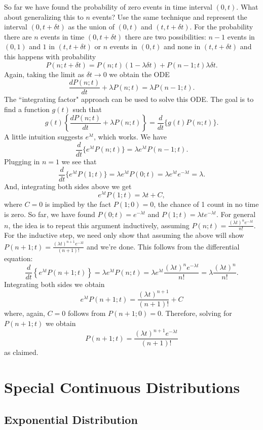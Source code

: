 \documentclass[]{book}
\begin{document}
So far we have found the probability of zero events in time interval
\((0,t)\). What about generalizing this to \(n\) events? Use the same
technique and represent the interval \((0, t+\delta t)\) as the union of
\((0,t)\) and \((t, t+\delta t)\). For the probability there are \(n\)
events in time \((0,t+\delta t)\) there are two possibilities: \(n-1\)
events in \((0,1)\) and \(1\) in \((t, t+\delta t)\) or \(n\) events in
\((0,t)\) and none in \((t, t+\delta t)\) and this happens with
probability
\[P(n;t+\delta t)  = P(n;t)(1-\lambda \delta t) + P(n-1;t)\lambda\delta t.\]
Again, taking the limit as \(\delta t \rightarrow 0\) we obtain the ODE
\[\frac{d P(n;t)}{dt} + \lambda P(n;t) = \lambda P(n-1;t).\] The
``integrating factor" approach can be used to solve this ODE. The goal
is to find a function \(g(t)\) such that
\[g(t)\left\{\frac{d P(n;t)}{dt} + \lambda P(n;t)\right\} = \frac{d}{dt}\{g(t)P(n;t)\}.\]
A little intuition suggests \(e^{\lambda t}\), which works. We have
\[\frac{d}{dt}\{e^{\lambda t}P(n;t)\} = \lambda e^{\lambda t}P(n-1;t).\]
Plugging in \(n=1\) we see that
\[\frac{d}{dt}\{e^{\lambda t}P(1;t)\} = \lambda e^{\lambda t}P(0;t) = \lambda e^{\lambda t}e^{-\lambda t} = \lambda.\]
And, integrating both sides above we get
\[e^{\lambda t}P(1;t) = \lambda t + C,\] where \(C = 0\) is implied by
the fact \(P(1;0) = 0\), the chance of 1 count in no time is zero. So
far, we have found \(P(0;t) = e^{-\lambda t}\) and
\(P(1;t) = \lambda t e^{-\lambda t}\). For general \(n\), the idea is to
repeat this argument inductively, assuming
\(P(n;t) = \frac{(\lambda t)^n e^{-\lambda t}}{n!}\). For the inductive
step, we need only show that assuming the above will show
\(P(n+1;t) = \frac{(\lambda t)^{n+1} e^{-\lambda t}}{(n+1)!}\) and we're
done. This follows from the differential equation:
\[\frac{d}{dt}\left\{e^{\lambda t}P(n+1;t)\right\} = \lambda e^{\lambda t}P(n;t) = \lambda e^{\lambda t} \frac{(\lambda t)^n e^{-\lambda t}}{n!} = \lambda \frac{(\lambda t)^n}{n!}.\]
Integrating both sides we obtain
\[e^{\lambda t}P(n+1;t) = \frac{(\lambda t)^{n+1}}{(n+1)!}+C\] where,
again, \(C=0\) follows from \(P(n+1;0) = 0\). Therefore, solving for
\(P(n+1;t)\) we obtain
\[P(n+1;t) = \frac{(\lambda t)^{n+1}e^{-\lambda t}}{(n+1)!}\] as
claimed.

\chapter{Special Continuous
Distributions}\label{special-continuous-distributions}

\section{Exponential Distribution}\label{exponential-distribution}
\end{document}
